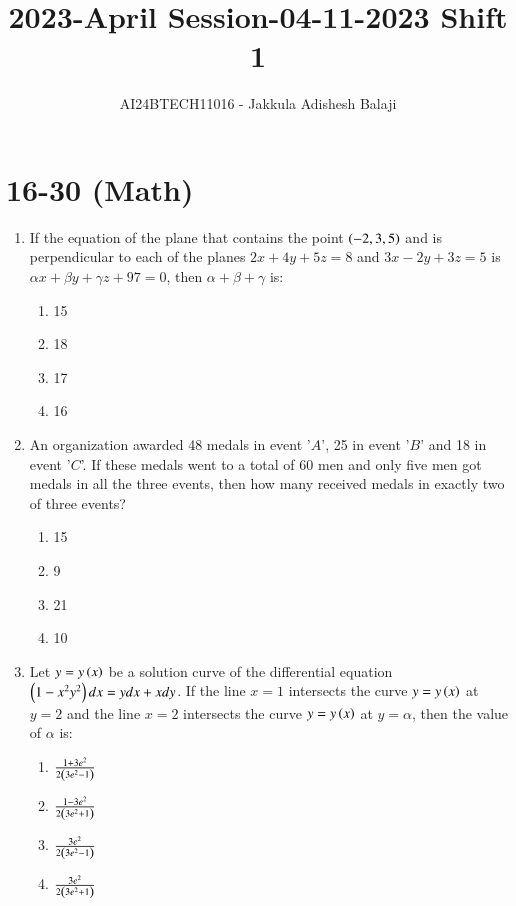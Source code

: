 \documentclass[journal]{IEEEtran}
\begin{document}

\title{2023-April Session-04-11-2023 Shift 1}
\author{AI24BTECH11016 - Jakkula Adishesh Balaji}
{\let\newpage\relax\maketitle}

\renewcommand{\thefigure}{\theenumi}
\renewcommand{\thetable}{\theenumi}
\setlength{\intextsep}{10pt} %

\section{16-30 (Math)}
\begin{enumerate}
	\item
	If the equation of the plane that contains the point $\left(-2, 3, 5\right)$ and is perpendicular to each of the planes $2x + 4y + 5z = 8$ and $3x - 2y + 3z = 5$ is $\alpha x + \beta y + \gamma z + 97 = 0$, then $\alpha + \beta + \gamma$ is:
		\begin{enumerate}
			\item 15
			\item 18
			\item 17
			\item 16
		\end{enumerate}

	\item
	An organization awarded 48 medals in event '$A$', 25 in event '$B$' and 18 in event '$C$'. If these medals went to a total of 60 men and only five men got medals in all the three events, then how many received medals in exactly two of three events?
		\begin{enumerate}
			\item 15
			\item 9
			\item 21
			\item 10
		\end{enumerate}

	\item
	Let $y = y\left(x\right)$ be a solution curve of the differential equation $\left(1 - x^{2}y^{2}\right)dx = y dx + x dy$. If the line $x = 1$ intersects the curve $y = y\left(x\right)$ at $y = 2$ and the line $x = 2$ intersects the curve $y = y\left(x\right)$ at $y = \alpha$, then the value of $\alpha$ is:
		\begin{enumerate}
			\item $\frac{1+3e^{2}}{2\left(3e^{2}-1\right)}$
			\item $\frac{1-3e^{2}}{2\left(3e^{2}+1\right)}$
			\item $\frac{3e^{2}}{2\left(3e^{2}-1\right)}$
			\item $\frac{3e^{2}}{2\left(3e^{2}+1\right)}$
		\end{enumerate}


\end{enumerate}
\end{document}
